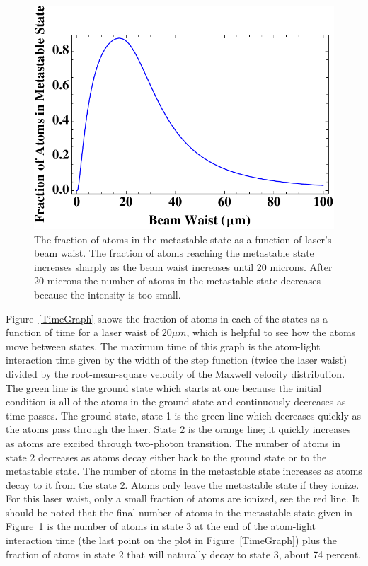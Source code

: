 \documentclass[prb,preprint]{revtex4-1}
\begin{document}
\begin{figure}[h!]
\centering
\includegraphics[width=6in]{MetaGraph1.pdf}
\caption{The fraction of atoms in the metastable state as a function of laser's beam waist. The fraction of atoms reaching the metastable state increases sharply as the beam waist increases until 20 microns. After 20 microns the number of atoms in the metastable state decreases because the intensity is too small.}
\label{MetaGraph1}
\end{figure}

Figure~\ref{TimeGraph} shows the fraction of atoms in each of the states as a function of time for a laser waist of $20 \mu m$, which is helpful to see how the atoms move between states. The maximum time of this graph is the atom-light interaction time given by the width of the step function (twice the laser waist) divided by the root-mean-square velocity of the Maxwell velocity distribution.   The green line is the ground state which starts at one because the initial condition is all of the atoms in the ground state and continuously decreases as time passes. The ground state, state 1 is the green line which decreases quickly as the atoms pass through the laser. State 2 is the orange line; it quickly increases as atoms are excited through two-photon transition. The number of atoms in state 2 decreases as atoms decay either back to the ground state or to the metastable state. The number of atoms in the metastable state increases as atoms decay to it from the state 2. Atoms only leave the metastable state if they ionize. For this laser waist, only a small fraction of atoms are ionized, see the red line.  It should be noted that the final number of atoms in the metastable state given in Figure~\ref{MetaGraph1} is the number of atoms in state 3 at the end of the atom-light interaction time (the last point on the plot in Figure~\ref{TimeGraph}) plus the fraction of atoms in state 2 that will naturally decay to state 3, about 74 percent.
\end{document}
